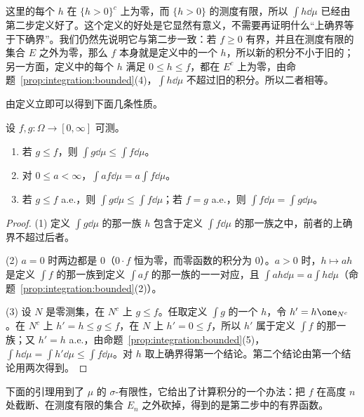这里的每个 $h$ 在 $\{h>0\}^c$ 上为零，而 $\{h>0\}$ 的测度有限，所以 $\int h\dd\mu$ 已经由第二步定义好了。这个定义的好处是它显然有意义，不需要再证明什么“上确界等于下确界”。我们仍然先说明它与第二步一致：若 $f\geqslant0$ 有界，并且在测度有限的集合 $E$ 之外为零，那么 $f$ 本身就是定义中的一个 $h$，所以新的积分不小于旧的；另一方面，定义中的每个 $h$ 满足 $0\leqslant h\leqslant f$，都在 $E^c$ 上为零，由命题~\ref{prop:integration:bounded}(4)，$\int h\dd\mu$ 不超过旧的积分。所以二者相等。

由定义立即可以得到下面几条性质。

\begin{proposition}\label{prop:integration:nonnegative-basic}
设 $f,g:\Omega\to[0,\infty]$ 可测。
\begin{enumerate}
\item 若 $g\leqslant f$，则 $\int g\dd\mu\leqslant\int f\dd\mu$。
\item 对 $0\leqslant a<\infty$，$\int af\dd\mu=a\int f\dd\mu$。
\item 若 $g\leqslant f$ a.e.，则 $\int g\dd\mu\leqslant\int f\dd\mu$；若 $f=g$ a.e.，则 $\int f\dd\mu=\int g\dd\mu$。
\end{enumerate}
\end{proposition}
\begin{proof}
(1) 定义 $\int g\dd\mu$ 的那一族 $h$ 包含于定义 $\int f\dd\mu$ 的那一族之中，前者的上确界不超过后者。

(2) $a=0$ 时两边都是 $0$（$0\cdot f$ 恒为零，而零函数的积分为 $0$）。$a>0$ 时，$h\mapsto ah$ 是定义 $\int f$ 的那一族到定义 $\int af$ 的那一族的一一对应，且 $\int ah\dd\mu=a\int h\dd\mu$（命题~\ref{prop:integration:bounded}(2)）。

(3) 设 $N$ 是零测集，在 $N^c$ 上 $g\leqslant f$。任取定义 $\int g$ 的一个 $h$，令 $h'=h\one_{N^c}$。在 $N^c$ 上 $h'=h\leqslant g\leqslant f$，在 $N$ 上 $h'=0\leqslant f$，所以 $h'$ 属于定义 $\int f$ 的那一族；又 $h'=h$ a.e.，由命题~\ref{prop:integration:bounded}(5)，$\int h\dd\mu=\int h'\dd\mu\leqslant\int f\dd\mu$。对 $h$ 取上确界得第一个结论。第二个结论由第一个结论用两次得到。
\end{proof}

下面的引理用到了 $\mu$ 的 $\sigma$-有限性，它给出了计算积分的一个办法：把 $f$ 在高度 $n$ 处截断、在测度有限的集合 $E_n$ 之外砍掉，得到的是第二步中的有界函数。

